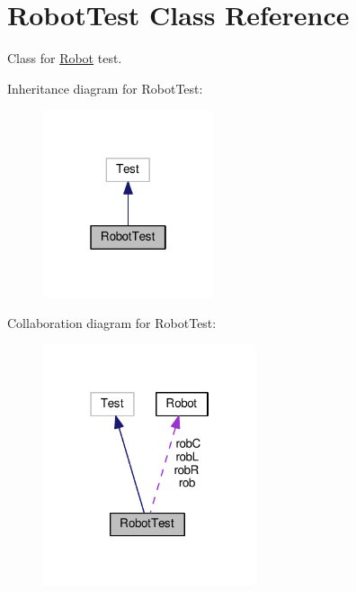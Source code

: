 \hypertarget{class_robot_test}{}\section{Robot\+Test Class Reference}
\label{class_robot_test}


Class for \hyperlink{class_robot}{Robot} test.  




Inheritance diagram for Robot\+Test\+:
\nopagebreak
\begin{figure}[H]
\begin{center}
\leavevmode
\includegraphics[width=142pt]{class_robot_test__inherit__graph}
\end{center}
\end{figure}


Collaboration diagram for Robot\+Test\+:
\nopagebreak
\begin{figure}[H]
\begin{center}
\leavevmode
\includegraphics[width=178pt]{class_robot_test__coll__graph}
\end{center}
\end{figure}
